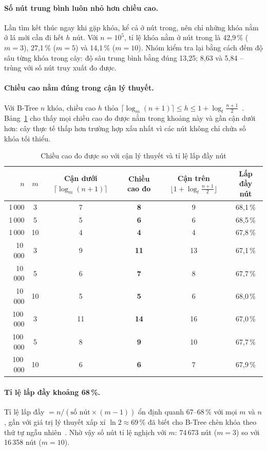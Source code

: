 \paragraph{Số nút trung bình luôn nhỏ hơn chiều cao.} Lần tìm kết thúc ngay khi gặp khóa, kể cả ở nút trong,
nên chỉ những khóa nằm ở lá mới cần đi hết $h$ nút. Với $n = 10^5$, tỉ lệ khóa nằm ở nút trong là 42,9\,\%
($m=3$), 27,1\,\% ($m=5$) và 14,1\,\% ($m=10$). Nhóm kiểm tra lại bằng cách đếm độ sâu từng khóa trong cây: độ sâu
trung bình bằng đúng 13,25; 8,63 và 5,84 -- trùng với số nút truy xuất đo được.

\paragraph{Chiều cao nằm đúng trong cận lý thuyết.} Với B-Tree $n$ khóa, chiều cao $h$ thỏa
$\lceil\log_m(n+1)\rceil \le h \le 1 + \log_t\frac{n+1}{2}$~\cite{clrs}. Bảng~\ref{tab:canchieucao} cho thấy mọi
chiều cao đo được nằm trong khoảng này và gần cận dưới hơn: cây thực tế thấp hơn trường hợp xấu nhất vì các nút
không chỉ chứa số khóa tối thiểu.

\begin{table}[htbp]
\centering\small
\caption{Chiều cao đo được so với cận lý thuyết và tỉ lệ lấp đầy nút}
\label{tab:canchieucao}
\begin{tabular}{@{}r c c c c c@{}}
\toprule
$n$ & $m$ & Cận dưới $\lceil\log_m(n+1)\rceil$ & \textbf{Chiều cao đo} & Cận trên $\lfloor 1+\log_t\frac{n+1}{2}\rfloor$ & Lấp đầy nút \\
\midrule
1\,000 & 3 & 7 & \textbf{8} & 9 & 68,1\,\% \\
1\,000 & 5 & 5 & \textbf{6} & 6 & 68,5\,\% \\
1\,000 & 10 & 4 & \textbf{4} & 4 & 67,8\,\% \\
\midrule
10\,000 & 3 & 9 & \textbf{11} & 13 & 67,1\,\% \\
10\,000 & 5 & 6 & \textbf{7} & 8 & 67,7\,\% \\
10\,000 & 10 & 5 & \textbf{5} & 6 & 68,0\,\% \\
\midrule
100\,000 & 3 & 11 & \textbf{14} & 16 & 67,0\,\% \\
100\,000 & 5 & 8 & \textbf{9} & 10 & 67,7\,\% \\
100\,000 & 10 & 6 & \textbf{6} & 7 & 67,9\,\% \\
\bottomrule
\end{tabular}
\end{table}

\paragraph{Tỉ lệ lấp đầy khoảng 68\,\%.} Tỉ lệ lấp đầy $= n / (\text{số nút}\times(m-1))$ ổn định quanh 67--68\,\%
với mọi $m$ và $n$, gần với giá trị lý thuyết xấp xỉ $\ln 2 \approx 69\,\%$ đã biết cho B-Tree chèn khóa theo thứ
tự ngẫu nhiên~\cite{yao}. Nhờ vậy số nút tỉ lệ nghịch với $m$: 74\,673 nút ($m=3$) so với 16\,358 nút ($m=10$).

